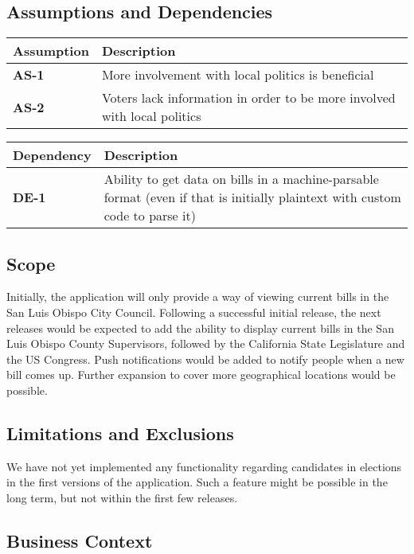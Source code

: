 \subsection{Assumptions and Dependencies}
\begin{tabu}{lX}
  \toprule
  Assumption    & Description \\
  \midrule
  \textbf{AS-1} & More involvement with local politics is beneficial \\

  \textbf{AS-2} & Voters lack information in order to be more involved
  with local politics \\
  \bottomrule
\end{tabu}
\vspace{.3in}
\noindent\begin{tabu}{lX}
  \toprule
  Dependency    & Description \\
  \midrule
  \textbf{DE-1} &
  Ability to get data on bills in a machine-parsable format (even if
  that is initially plaintext with custom code to parse it) \\
  \bottomrule
\end{tabu}

\subsection{Scope}
Initially, the application will only provide a way of viewing current
bills in the San Luis Obispo City Council. Following a successful initial release, the next releases would be expected to add the ability to display current bills in the San Luis
Obispo County Supervisors, followed by the California State
Legislature and the US Congress. Push notifications would be added to
notify people when a new bill comes up. Further expansion to cover more geographical locations would be possible.

\subsection{Limitations and Exclusions}
We have not yet implemented any functionality regarding candidates in
elections in the first versions of the application. Such a feature
might be possible in the long term, but not within the first few
releases.

\subsection{Business Context}
